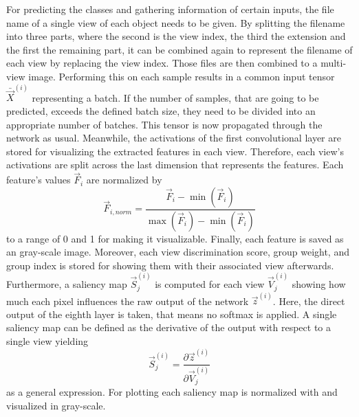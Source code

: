 For predicting the classes and gathering information of certain inputs, the file name of a single view of each object needs to be given.
By splitting the filename into three parts, where the second is the view index, the third the extension and the first the remaining part, it can be combined again to represent the filename of each view by replacing the view index.
Those files are then combined to a multi-view image.
Performing this on each sample results in a common input tensor $\bar{\vec{X}}^{(i)}$ representing a batch.
If the number of samples, that are going to be predicted, exceeds the defined batch size, they need to be divided into an appropriate number of batches.
This tensor is now propagated through the network as usual.
Meanwhile, the activations of the first convolutional layer are stored for visualizing the extracted features in each view.
Therefore, each view's activations are split across the last dimension that represents the features.
Each feature's values $\vec{F}_i$ are normalized by
\begin{equation}
	\label{eq:normalize}
	\vec{F}_{i,norm} = \frac{\vec{F}_i - \min(\vec{F}_i)}{\max(\vec{F}_i) - \min(\vec{F}_i)} 
\end{equation}
to a range of 0 and 1 for making it visualizable.
Finally, each feature is saved as an gray-scale image.
Moreover, each view discrimination score, group weight, and group index is stored for showing them with their associated view afterwards.
Furthermore, a saliency map $\vec{S}_j^{(i)}$ is computed for each view $\vec{V}_j^{(i)}$ showing how much each pixel influences the raw output of the network $\vec{z}^{(i)}$.
Here, the direct output of the eighth layer is taken, that means no softmax is applied.
A single saliency map can be defined as the derivative of the output with respect to a single view yielding
\begin{equation}
	\label{eq:saliency-map}
	\vec{S}_j^{(i)} = \frac{\partial \vec{z}^{(i)}}{\partial \vec{V}_j^{(i)}}
\end{equation}
as a general expression.
For plotting each saliency map is normalized with  and visualized in gray-scale.